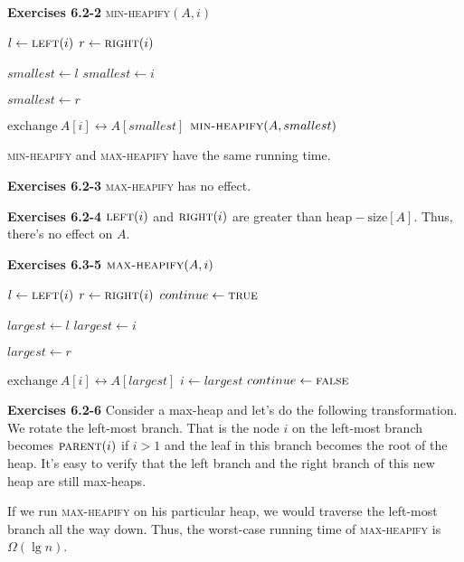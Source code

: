 \documentclass[a4paper,12pt]{article}
\newcommand{\newpar}[1]
{\bigskip \noindent \textbf{Exercises #1} \newline}
\newcommand{\la}{\leftarrow}
\newcommand{\exchange}[2]{\mathrm{exchange}\ #1 \leftrightarrow #2}
\begin{document}
\newpar{6.2-2}
\textsc{min-heapify}$(A, i)$
\begin{algorithmic}
  \STATE $l \la \textsc{left}(i)$
  \STATE $r \la \textsc{right}(i)$

  \STATE $smallest \la l$
  \ELSE
  \STATE $smallest \la i$
  \ENDIF

  \STATE $smallest \la r$
  \ENDIF

  \STATE $\exchange{A[i]}{A[smallest]}$
  \STATE $\textsc{min-heapify}(A, smallest)$
  \ENDIF
\end{algorithmic}

\textsc{min-heapify} and \textsc{max-heapify} have the same running
time.

\newpar{6.2-3}
\textsc{max-heapify} has no effect.

\newpar{6.2-4}
$\textsc{left}(i)$ and $\textsc{right}(i)$ are greater than
$\mathrm{heap-size}[A]$.  Thus, there's no effect on $A$.

\newpar{6.3-5}
$\textsc{max-heapify}(A, i)$
\begin{algorithmic}
  \STATE $l \la \textsc{left}(i)$
  \STATE $r \la \textsc{right}(i)$
  \STATE $continue \la \textsc{true}$

  \STATE $largest \la l$
  \ELSE
  \STATE $largest \la i$
  \ENDIF

  \STATE $largest \la r$
  \ENDIF

  \STATE $\exchange{A[i]}{A[largest]}$
  \STATE $i \la largest$
  \ELSE
  \STATE $continue \la \textsc{false}$
  \ENDIF
  \ENDWHILE
\end{algorithmic}

\newpar{6.2-6}
Consider a max-heap and let's do the following transformation.  We
rotate the left-most branch.  That is the node $i$ on the left-most
branch becomes $\textsc{parent}(i)$ if $i > 1$ and the leaf in this
branch becomes the root of the heap.  It's easy to verify that the
left branch and the right branch of this new heap are still
max-heaps.

If we run \textsc{max-heapify} on his particular heap, we would
traverse the left-most branch all the way down.  Thus, the worst-case
running time of \textsc{max-heapify} is $\Omega(\lg n)$.
\end{document}
